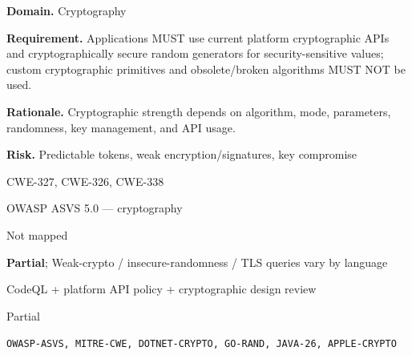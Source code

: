 \documentclass[10pt,letterpaper]{article}
\newcommand{\prioritybadge}[2]{\tcbox[on line,boxrule=0pt,arc=1.2mm,boxsep=0.7mm,left=1mm,right=1mm,top=0.4mm,bottom=0.4mm,colback=#2!12,coltext=#2]{\scriptsize\bfseries #1}}
\begin{document}
\begin{rulebox}[title={\texttt{SCS-ALL-CRYPTO-001} \hfill \prioritybadge{Critical Control}{Critical}}]
\textbf{Domain.} Cryptography

\textbf{Requirement.} Applications MUST use current platform cryptographic APIs and cryptographically secure random generators for security-sensitive values; custom cryptographic primitives and obsolete/broken algorithms MUST NOT be used.

\textbf{Rationale.} Cryptographic strength depends on algorithm, mode, parameters, randomness, key management, and API usage.

\textbf{Risk.} Predictable tokens, weak encryption/signatures, key compromise

\begin{description}[leftmargin=2.65cm,labelwidth=2.3cm,style=nextline,itemsep=1pt,topsep=3pt]
  \item[CWE] CWE-327, CWE-326, CWE-338
  \item[OWASP] OWASP ASVS 5.0 --- cryptography
  \item[CERT] Not mapped
  \item[CodeQL] \textbf{Partial}; Weak-crypto / insecure-randomness / TLS queries vary by language
  \item[Enforcement] CodeQL + platform API policy + cryptographic design review
  \item[Automation] Partial
  \item[Sources] \texttt{OWASP-ASVS, MITRE-CWE, DOTNET-CRYPTO, GO-RAND, JAVA-26, APPLE-CRYPTO}
\end{description}
\end{rulebox}
\end{document}

